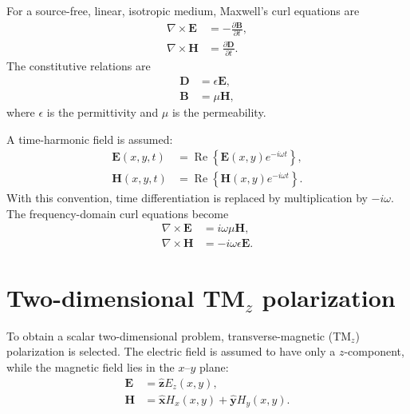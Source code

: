 \documentclass{article}
\begin{document}
For a source-free, linear, isotropic medium, Maxwell's curl equations are
\begin{align}
    \nabla\times\mathbf{E}
    &= -\frac{\partial\mathbf{B}}{\partial t},
    \label{eq:maxwell_faraday}\\
    \nabla\times\mathbf{H}
    &= \frac{\partial\mathbf{D}}{\partial t}.
    \label{eq:maxwell_ampere}
\end{align}
The constitutive relations are
\begin{align}
    \mathbf{D} &= \epsilon\mathbf{E},\\
    \mathbf{B} &= \mu\mathbf{H},
\end{align}
where $\epsilon$ is the permittivity and $\mu$ is the permeability.

A time-harmonic field is assumed:
\begin{align}
    \mathbf{E}(x,y,t)
    &= \operatorname{Re}\left\{
       \mathbf{E}(x,y)e^{-i\omega t}\right\},\\
    \mathbf{H}(x,y,t)
    &= \operatorname{Re}\left\{
       \mathbf{H}(x,y)e^{-i\omega t}\right\}.
\end{align}
With this convention, time differentiation is replaced by multiplication
by $-i\omega$. The frequency-domain curl equations become
\begin{align}
    \nabla\times\mathbf{E}
    &= i\omega\mu\mathbf{H},
    \label{eq:freq_faraday}\\
    \nabla\times\mathbf{H}
    &= -i\omega\epsilon\mathbf{E}.
    \label{eq:freq_ampere}
\end{align}

\section{Two-dimensional TM$_z$ polarization}

To obtain a scalar two-dimensional problem, transverse-magnetic
(TM$_z$) polarization is selected. The electric field is assumed to have
only a $z$-component, while the magnetic field lies in the $x$--$y$ plane:
\begin{align}
    \mathbf{E} &= \hat{\mathbf{z}}E_z(x,y),\\
    \mathbf{H} &= \hat{\mathbf{x}}H_x(x,y)
                 +\hat{\mathbf{y}}H_y(x,y).
\end{align}
\end{document}
